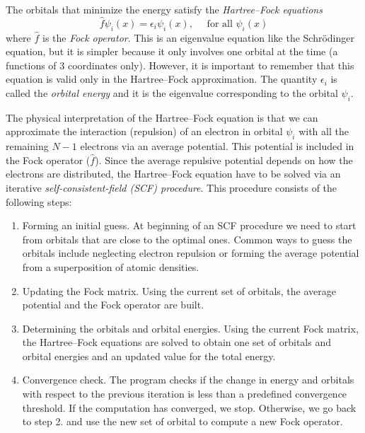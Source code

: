 \documentclass[../Main/chem371-notes.tex]{subfiles}
\begin{document}
The orbitals that minimize the energy satisfy the \emph{Hartree--Fock equations}
\begin{equation}
\hat{f} \psi_i(x) = \epsilon_i  \psi_i(x), \quad \text{ for all } \psi_i(x)
\end{equation}
where $\hat{f}$ is the \emph{Fock operator}.
This is an eigenvalue equation like the Schr\"{o}dinger equation, but it is simpler because it only involves one orbital at the time (a functions of 3 coordinates only).
However, it is important to remember that this equation is valid only in the Hartree--Fock approximation.
The quantity $\epsilon_i$ is called the \emph{orbital energy} and it is the eigenvalue corresponding to the orbital $\psi_i$.

The physical interpretation of the Hartree--Fock equation is that we can approximate the interaction (repulsion) of an electron in orbital $\psi_i$ with all the remaining $N-1$ electrons via an average potential. This potential is included in the Fock operator ($\hat{f}$).
Since the average repulsive potential depends on how the electrons are distributed, the Hartree--Fock equation have to be solved via an iterative \emph{self-consistent-field (SCF) procedure}.
This procedure consists of the following steps:
\begin{enumerate}
\item Forming an initial guess. At beginning of an SCF procedure we need to start from orbitals that are close to the optimal ones.
Common ways to guess the orbitals include neglecting electron repulsion or forming the average potential from a superposition of atomic densities.
\item Updating the Fock matrix. Using the current set of orbitals, the average potential and the Fock operator are built. 
\item Determining the orbitals and orbital energies. Using the current Fock matrix, the Hartree--Fock equations are solved to obtain one set of orbitals and orbital energies and an updated value for the total energy.
\item Convergence check. The program checks if the change in energy and orbitals with respect to the previous iteration is less than a predefined convergence threshold. If the computation has converged, we stop. Otherwise, we go back to step 2. and use the new set of orbital to compute a new Fock operator.
\end{enumerate}
\end{document}
